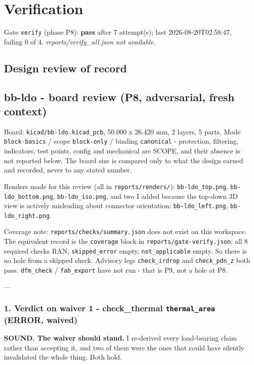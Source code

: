 \documentclass[11pt,a4paper]{article}
\begin{document}
\section{Verification}
Gate \texttt{verify} (phase P8): \textbf{pass} after 7 attempt(s); last 2026-08-20T02:58:47, failing 0 of 4.
\emph{reports/verify\_all.json not available.}
\subsection*{Design review of record}
\subsection*{bb-ldo - board review (P8, adversarial, fresh context)}
Board: \texttt{kicad/bb-ldo.kicad\_pcb}, 50.000 x 26.420 mm, 2 layers, 5 parts. Mode \texttt{block-basics} / scope \texttt{block-only} / binding \texttt{canonical} - protection, filtering, indicators, test points, config and mechanical are SCOPE, and their absence is not reported below. The board size is compared only to what the design earned and recorded, never to any stated number.

Renders made for this review (all in \texttt{reports/renders/}): \texttt{bb-ldo\_top.png}, \texttt{bb-ldo\_bottom.png}, \texttt{bb-ldo\_iso.png}, and two I added because the top-down 3D view is actively misleading about connector orientation: \texttt{bb-ldo\_left.png}, \texttt{bb-ldo\_right.png}.

Coverage note: \texttt{reports/checks/summary.json} does not exist on this workspace. The equivalent record is the \texttt{coverage} block in \texttt{reports/gate-verify.json}: all 8 required checks RAN, \texttt{skipped\_error} empty, \texttt{not\_applicable} empty. So there is no hole from a skipped check. Advisory legs \texttt{check\_irdrop} and \texttt{check\_pdn\_z} both pass. \texttt{dfm\_check} / \texttt{fab\_export} have not run - that is P9, not a hole at P8.

---

\subsubsection*{1. Verdict on waiver 1 - check\_thermal \texttt{thermal\_area} (ERROR, waived)}
\textbf{SOUND. The waiver should stand.} I re-derived every load-bearing claim rather than accepting it, and two of them were the ones that could have silently invalidated the whole thing. Both hold.
\end{document}
